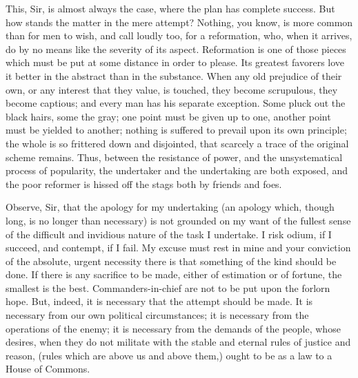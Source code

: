This, Sir, is almost always the case, where the plan has complete success. But how stands the matter in the mere attempt? Nothing, you know, is more common than for men to wish, and call loudly too, for a reformation, who, when it arrives, do by no means like the severity of its aspect. Reformation is one of those pieces which must be put at some distance in order to please. Its greatest favorers love it better in the abstract than in the substance. When any old prejudice of their own, or any interest that they value, is touched, they become scrupulous, they become captious; and every man has his separate exception. Some pluck out the black hairs, some the gray; one point must be given up to one, another point must be yielded to another; nothing is suffered to prevail upon its own principle; the whole is so frittered down and disjointed, that scarcely a trace of the original scheme remains. Thus, between the resistance of power, and the unsystematical process of popularity, the undertaker and the undertaking are both exposed, and the poor reformer is hissed off the stags both by friends and foes.

Observe, Sir, that the apology for my undertaking (an apology which, though long, is no longer than necessary) is not grounded on my want of the fullest sense of the difficult and invidious nature of the task I undertake. I risk odium, if I succeed, and contempt, if I fail. My excuse must rest in mine and your conviction of the absolute, urgent necessity there is that something of the kind should be done. If there is any sacrifice to be made, either of estimation or of fortune, the smallest is the best. Commanders-in-chief are not to be put upon the forlorn hope. But, indeed, it is necessary that the attempt should be made. It is necessary from our own political circumstances; it is necessary from the operations of the enemy; it is necessary from the demands of the people, whose desires, when they do not militate with the stable and eternal rules of justice and reason, (rules which are above us and above them,) ought to be as a law to a House of Commons.

